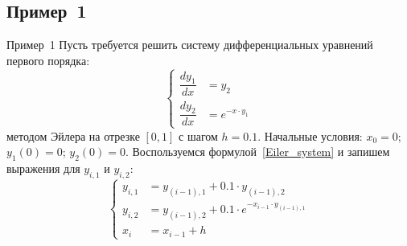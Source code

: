 \documentclass[aspectratio=169, mathserif]{beamer}	%
\begin{document}
\subsection{Пример~1}
\begin{frame}[fragile, label=c]{Пример~1}\label{slide:example1}
\scriptsize
Пусть требуется решить систему дифференциальных уравнений первого порядка:
\vfill
\begin{equation*}
	\left\{
	\begin{aligned}
		\dfrac{dy_1}{dx} &= y_2 \\
		\dfrac{dy_2}{dx} &= e^{-x\cdot y_1}
	\end{aligned}
	\right.
\end{equation*}
\vfill
\noindent методом Эйлера на отрезке $[0, 1]$ с шагом $h=0.1$.
\vfill
Начальные условия: $x_0 = 0$; $y_1(0)=0$; $y_2(0)=0$.
\vfill
Воспользуемся формулой~\eqref{Eiler_system} и запишем выражения для $y_{i,1}$ и $y_{i,2}$:
\vfill
\begin{equation*}
	\left\{
	\begin{aligned}
		y_{i,1} &= y_{(i-1),1} + 0.1 \cdot y_{(i-1),2} \\
		y_{i,2} &= y_{(i-1),2} + 0.1 \cdot e^{-x_{i-1}\cdot y_{(i-1),1}} \\
		x_i &= x_{i-1} + h
	\end{aligned}
	\right.
\end{equation*}
\vfill
\end{frame}
\end{document}
